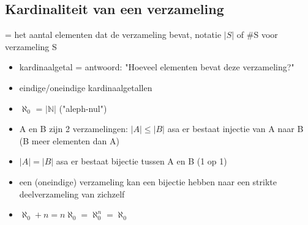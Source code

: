\documentclass{article}
\begin{document}
\subsection{Kardinaliteit van een verzameling}
= het aantal elementen dat de verzameling bevat, notatie $|S|$ of \#S voor verzameling S
\begin{itemize}
    \item kardinaalgetal = antwoord: "Hoeveel elementen bevat deze verzameling?"
    \item eindige/oneindige kardinaalgetallen
    \item $\aleph_0$ = $|\mathbb{N}|$ ("aleph-nul")
    \item A en B zijn 2 verzamelingen: $|A| \leq |B|$ asa er bestaat injectie van A naar B (B meer elementen dan A)
    \item $|A| = |B|$ asa er bestaat bijectie tussen A en B (1 op 1)
    \item een (oneindige) verzameling kan een bijectie hebben naar een strikte deelverzameling van zichzelf
    \item $\aleph_0 + n = n \aleph_0 = \aleph_0^n = \aleph_0$  
\end{itemize}
\end{document}
